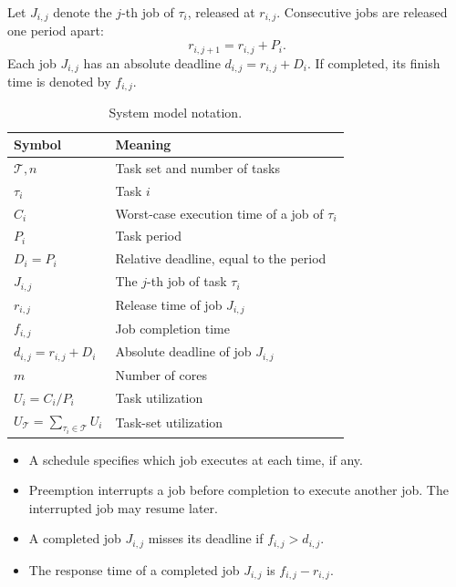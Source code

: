\documentclass[conference]{IEEEtran}
\begin{document}
Let $J_{i,j}$ denote the $j$-th job of $\tau_i$, released at $r_{i,j}$. Consecutive jobs are released one period apart:
\begin{equation}
  \label{eq:constr_releases}
  r_{i,j+1}=r_{i,j}+P_i.
\end{equation}
Each job $J_{i,j}$ has an absolute deadline $d_{i,j}=r_{i,j}+D_i$. If completed, its finish time is denoted by $f_{i,j}$.

\begin{table}[!b]
	\centering
	\caption{System model notation.}
	\label{tab:system_model}
	\small
	\renewcommand{\arraystretch}{1.15}
	\begin{tabularx}{\columnwidth}{l >{\raggedright\arraybackslash}X}
		\hline
		\textbf{Symbol} & \textbf{Meaning} \\
		\hline
		$\mathcal{T}, n$ & Task set and number of tasks \\
		$\tau_i$ & Task $i$ \\
		$C_i$ & Worst-case execution time of a job of $\tau_i$ \\
		$P_i$ & Task period \\
		$D_i=P_i$ & Relative deadline, equal to the period \\
		$J_{i,j}$ & The $j$-th job of task $\tau_i$ \\
		$r_{i,j}$ & Release time of job $J_{i,j}$ \\
		$f_{i,j}$ & Job completion time \\
		$d_{i,j}=r_{i,j}+D_i$ & Absolute deadline of job $J_{i,j}$ \\
		$m$ & Number of cores \\
		$U_i=C_i/P_i$ & Task utilization \\
		$U_{\mathcal{T}}=\sum_{\tau_i\in\mathcal{T}} U_i$ & Task-set utilization \\
		\hline
	\end{tabularx}
\end{table}

\begin{itemize}
	\item A schedule specifies which job executes at each time, if any.
	\item Preemption interrupts a job before completion to execute another job. The interrupted job may resume later.
	\item A completed job $J_{i,j}$ misses its deadline if $f_{i,j}>d_{i,j}$.
	\item The response time of a completed job $J_{i,j}$ is $f_{i,j}-r_{i,j}$.
\end{itemize}
\end{document}
